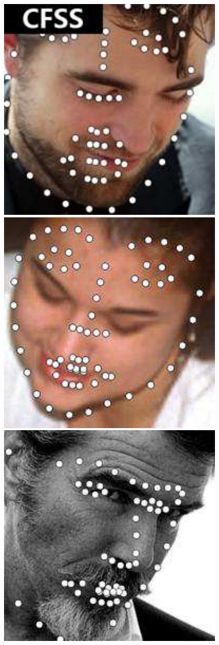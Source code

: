 \documentclass[journal]{IEEEtran}
\begin{document}
\begin{figure}[!htb]
\includegraphics[scale=0.22]{68_CFSS_image_046}
\includegraphics[scale=0.22]{68_CFSS_image_081}
\includegraphics[scale=0.22]{68_CFSS_image_044}

\end{figure}
\end{document}
